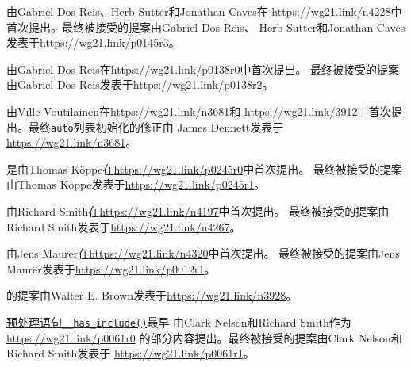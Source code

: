 由Gabriel Dos Reis、Herb Sutter和Jonathan Caves在
\url{https://wg21.link/n4228}中首次提出。最终被接受的提案由Gabriel Dos Reis、
Herb Sutter和Jonathan Caves发表于\url{https://wg21.link/p0145r3}。

由Gabriel Dos Reis在\url{https://wg21.link/p0138r0}中首次提出。
最终被接受的提案由Gabriel Dos Reis发表于\url{https://wg21.link/p0138r2}。

由Ville Voutilainen在\url{https://wg21.link/n3681}和
\url{https://wg21.link/3912}中首次提出。最终\texttt{auto}列表初始化的修正由
James Dennett发表于\url{https://wg21.link/n3681}。

是由Thomas Köppe在\url{https://wg21.link/p0245r0}中首次提出。
最终被接受的提案由Thomas Köppe发表于\url{https://wg21.link/p0245r1}。

由Richard Smith在\url{https://wg21.link/n4197}中首次提出。
最终被接受的提案由Richard Smith发表于\url{https://wg21.link/n4267}。

由Jens Maurer在\url{https://wg21.link/n4320}中首次提出。
最终被接受的提案由Jens Maurer发表于\url{https://wg21.link/p0012r1}。

的提案由Walter E. Brown发表于\url{https://wg21.link/n3928}。

\hyperref[ch8.9]{预处理语句\texttt{\_\_has\_include()}}最早
由Clark Nelson和Richard Smith作为\url{https://wg21.link/p0061r0}
的部分内容提出。最终被接受的提案由Clark Nelson和Richard Smith发表于
\url{https://wg21.link/p0061r1}。








